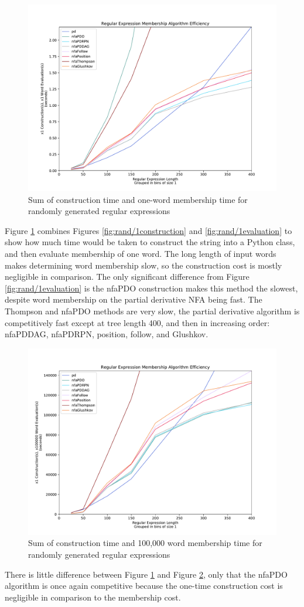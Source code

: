 \begin{figure}[H]
  \center
  \includegraphics[width=0.75\linewidth]{fig/rand/1const1eval}
  \caption{Sum of construction time and one-word membership time for randomly generated regular expressions}
  \label{fig:rand/1const1eval}
\end{figure}

Figure \ref{fig:rand/1const1eval} combines Figures \ref{fig:rand/1construction} and \ref{fig:rand/1evaluation} to show how much time would be taken to construct the string into a Python class, and then evaluate membership of one word. The long length of input words makes determining word membership slow, so the construction cost is mostly negligible in comparison. The only significant difference from Figure \ref{fig:rand/1evaluation} is the nfaPDO construction makes this method the slowest, despite word membership on the partial derivative NFA being fast. The Thompson and nfaPDO methods are very slow, the partial derivative algorithm is competitively fast except at tree length 400, and then in increasing order: nfaPDDAG, nfaPDRPN, position, follow, and Glushkov.

\begin{figure}[H]
  \center
  \includegraphics[width=0.75\linewidth]{fig/rand/1const10e6eval}
  \caption{Sum of construction time and 100,000 word membership time for randomly generated regular expressions}
  \label{fig:rand/1const10e6eval}
\end{figure}

There is little difference between Figure \ref{fig:rand/1const1eval} and Figure \ref{fig:rand/1const10e6eval}, only that the nfaPDO algorithm is once again competitive because the one-time construction cost is negligible in comparison to the membership cost.









